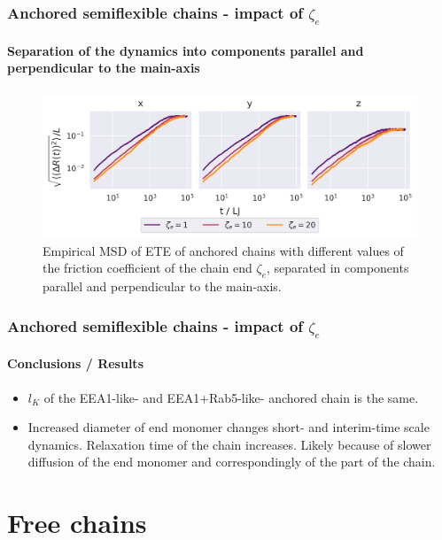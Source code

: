 \documentclass[handout]{beamer}
\begin{document}

\begin{frame}
    \frametitle{Anchored semiflexible chains - impact of $\zeta_e$}
    \framesubtitle{Separation of the dynamics into components parallel and perpendicular to the main-axis}
    \begin{figure}[h]
        \includegraphics[width=11.2cm]{./14+15+16-exp-msd-dim-log.png}
        \caption{
        Empirical MSD of ETE of anchored chains with different values of the friction
        coefficient of the chain end $\zeta_e$, separated in components parallel and 
        perpendicular to the main-axis.
        }
    \end{figure}
\end{frame}


\begin{frame}
    \frametitle{Anchored semiflexible chains - impact of $\zeta_e$}
    \framesubtitle{Conclusions / Results}
    \begin{itemize}
        \item $l_K$ of the EEA1-like- and EEA1+Rab5-like- anchored chain is the same.
        \item Increased diameter of end monomer changes short- and interim-time scale 
        dynamics. Relaxation time of the chain increases. Likely because of slower
        diffusion of the end monomer and correspondingly of the part of the chain.
    \end{itemize}
\end{frame}


\section{Free chains}

\end{document}
